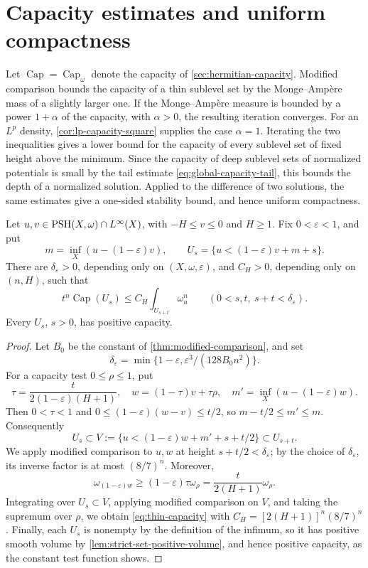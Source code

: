\section{Capacity estimates and uniform compactness}

Let $\operatorname{Cap}=\operatorname{Cap}_\omega$ denote the capacity of \cref{sec:hermitian-capacity}. Modified comparison bounds the capacity of a thin sublevel set by the Monge--Amp\`ere mass of a slightly larger one. If the Monge--Amp\`ere measure is bounded by a power $1+\alpha$ of the capacity, with $\alpha>0$, the resulting iteration converges. For an $L^p$ density, \cref{cor:lp-capacity-square} supplies the case $\alpha=1$. Iterating the two inequalities gives a lower bound for the capacity of every sublevel set of fixed height above the minimum. Since the capacity of deep sublevel sets of normalized potentials is small by the tail estimate \eqref{eq:global-capacity-tail}, this bounds the depth of a normalized solution. Applied to the difference of two solutions, the same estimates give a one-sided stability bound, and hence uniform compactness.

\begin{lemma}\label{lem:thin-sublevel-capacity}
Let $u,v\in\mathrm{PSH}(X,\omega)\cap L^\infty(X)$, with $-H\leq v\leq0$ and $H\geq1$. Fix $0<\varepsilon<1$, and put
\[
 m=\inf_X(u-(1-\varepsilon)v),\qquad
 U_s=\{u<(1-\varepsilon)v+m+s\}.
\]
There are $\delta_\varepsilon>0$, depending only on $(X,\omega,\varepsilon)$, and $C_H>0$, depending only on $(n,H)$, such that
\begin{equation}\label{eq:thin-capacity}
 t^n\operatorname{Cap}(U_s)\leq C_H\int_{U_{s+t}}\omega_u^n
 \qquad(0<s,t,\ s+t<\delta_\varepsilon).
\end{equation}
Every $U_s$, $s>0$, has positive capacity.
\end{lemma}
\begin{proof}
Let $B_0$ be the constant of \cref{thm:modified-comparison}, and set
\[
 \delta_\varepsilon=\min\{1-\varepsilon,\varepsilon^3/(128B_0n^2)\}.
\]
For a capacity test $0\leq\rho\leq1$, put
\[
 \tau=\frac{t}{2(1-\varepsilon)(H+1)},\quad
 w=(1-\tau)v+\tau\rho,\quad
 m'=\inf_X(u-(1-\varepsilon)w).
\]
Then $0<\tau<1$ and
$0\leq(1-\varepsilon)(w-v)\leq t/2$, so $m-t/2\leq m'\leq m$. Consequently
\[
 U_s\subset V:=\{u<(1-\varepsilon)w+m'+s+t/2\}
 \subset U_{s+t}.
\]
We apply modified comparison to $u,w$ at height $s+t/2<\delta_\varepsilon$; by the choice of $\delta_\varepsilon$, its inverse factor is at most $(8/7)^n$. Moreover,
\[
 \omega_{(1-\varepsilon)w}
 \geq(1-\varepsilon)\tau\omega_\rho
 =\frac{t}{2(H+1)}\omega_\rho.
\]
Integrating over $U_s\subset V$, applying modified comparison on $V$, and taking the supremum over $\rho$, we obtain \eqref{eq:thin-capacity} with $C_H=[2(H+1)]^n(8/7)^n$. Finally, each $U_s$ is nonempty by the definition of the infimum, so it has positive smooth volume by \cref{lem:strict-set-positive-volume}, and hence positive capacity, as the constant test function shows.
\end{proof}

